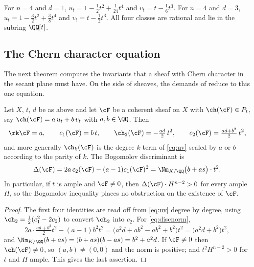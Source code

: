 \begin{example}\label{ex:planes}
For $n=4$ and $d=1$,
$u_{t}=1-\tfrac{1}{2}t^{2}+\tfrac{1}{24}t^{4}$ and
$v_{t}=t-\tfrac{1}{6}t^{3}$. For $n=4$ and $d=3$,
$u_{t}=1-\tfrac{3}{2}t^{2}+\tfrac{3}{8}t^{4}$ and
$v_{t}=t-\tfrac{1}{2}t^{3}$. All four classes are rational and lie in the
subring $\QQ[t]$.
\end{example}

\subsection{The Chern character equation}

The next theorem computes the invariants that a sheaf with Chern character in
the secant plane must have. On the side of sheaves, the demands of
 reduce to this one equation.

\begin{theorem}\label{thm:secantinvariants}
Let $X$, $t$, $d$ be as above and let $\cF$ be a coherent sheaf on $X$ with
$\ch(\cF)\in P_{t}$, say $\ch(\cF)=a\,u_{t}+b\,v_{t}$ with $a,b\in\QQ$. Then
\[
  \rk\cF=a,\qquad
  c_{1}(\cF)=b\,t,\qquad
  \ch_{2}(\cF)=-\tfrac{ad}{2}\,t^{2},\qquad
  c_{2}(\cF)=\tfrac{ad+b^{2}}{2}\,t^{2},
\]
and more generally $\ch_{k}(\cF)$ is the degree $k$ term of \eqref{eq:uv}
scaled by $a$ or $b$ according to the parity of $k$. The Bogomolov
discriminant is
\begin{equation}\label{eq:discnorm}
  \Delta(\cF)=2a\,c_{2}(\cF)-(a-1)c_{1}(\cF)^{2}
  =\Nm_{K/\QQ}\bigl(b+a s\bigr)\cdot t^{2}.
\end{equation}
In particular, if $t$ is ample and $\cF\ne0$, then
$\Delta(\cF)\cdot H^{n-2}>0$ for every ample $H$, so the Bogomolov inequality
places no obstruction on the existence of $\cF$.
\end{theorem}

\begin{proof}
The first four identities are read off from \eqref{eq:uv} degree by degree,
using $\ch_{2}=\tfrac12(c_{1}^{2}-2c_{2})$ to convert $\ch_{2}$ into $c_{2}$.
For \eqref{eq:discnorm},
\[
  2a\cdot\tfrac{ad+b^{2}}{2}t^{2}-(a-1)b^{2}t^{2}
  =\bigl(a^{2}d+ab^{2}-ab^{2}+b^{2}\bigr)t^{2}
  =\bigl(a^{2}d+b^{2}\bigr)t^{2},
\]
and $\Nm_{K/\QQ}(b+as)=(b+as)(b-as)=b^{2}+a^{2}d$. If $\cF\ne0$ then
$\ch(\cF)\ne0$, so $(a,b)\ne(0,0)$ and the norm is positive; and
$t^{2}H^{n-2}>0$ for $t$ and $H$ ample. This gives the last assertion.
\end{proof}

